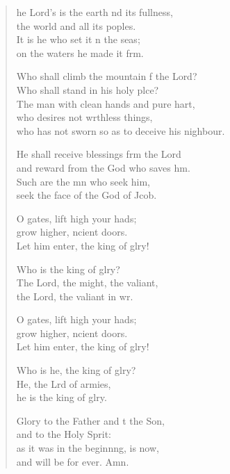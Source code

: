 \settowidth{\versewidth}{who has not sworn so as to deceive his neighbour.}
\begin{verse}%
  \begin{patverse}
    he Lord’s is the earth nd its fullness,\Med\\
    the world and all its poples.\\
It is he who set it n the seas;\Med\\
    on the waters he made it f\pointup{\i}rm.

Who shall climb the mountain f the Lord?\Med\\
    Who shall stand in his holy plce?\\
The man with clean hands and pure hart,\Flex\\
    who desires not wrthless things,\Med\\
    who has not sworn so as to deceive his nighbour.

He shall receive blessings frm the Lord\Med\\
    and reward from the God who saves h\pointup{\i}m.\\
Such are the mn who seek him,\Med\\
    seek the face of the God of Jcob.

O gates, lift high your hads;\Flex\\
    grow higher, ncient doors.\Med\\
    Let him enter, the king of glry!

Who is the king of glry?\Flex\\
    The Lord, the might, the valiant,\Med\\
    the Lord, the valiant in wr.

O gates, lift high your hads;\Flex\\
    grow higher, ncient doors.\Med\\
    Let him enter, the king of glry!

Who is he, the king of glry?\Flex\\
    He, the Lrd of armies,\Med\\
    he is the king of glry.

Glory to the Father and t the Son,\Med\\
    and to the Holy Sp\pointup{\i}rit:\\
as it was in the beginn\pointup{\i}ng, is now,\Med\\
    and will be for ever. Amn.
  \end{patverse}
\end{verse}
